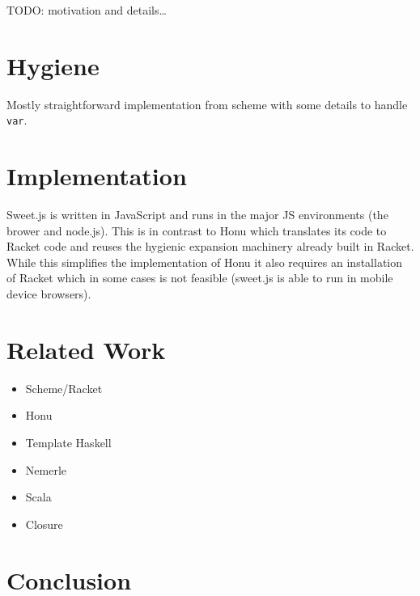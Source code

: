 \documentclass[preprint,10pt]{sigplanconf}
\begin{document}
TODO: motivation and details\ldots{}

\section{Hygiene}
\label{sec-4}

Mostly straightforward implementation from scheme with some details to
handle \texttt{var}.
\section{Implementation}
\label{sec-5}
Sweet.js is written in JavaScript and runs in the major JS
environments (\ie the brower and node.js). This is in contrast to Honu
which translates its code to Racket code and reuses the hygienic
expansion machinery already built in Racket. While this simplifies
the implementation of Honu it also requires an installation of Racket
which in some cases is not feasible (\eg sweet.js is able to run in
mobile device browsers).
\section{Related Work}
\label{sec-6}

\begin{itemize}
\item Scheme/Racket
\item Honu
\item Template Haskell
\item Nemerle
\item Scala
\item Closure
\end{itemize}
\section{Conclusion}
\label{sec-7}
\end{document}
